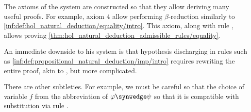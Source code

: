 \begin{remark}
  The axioms of the system are constructed so that they allow deriving many useful proofs. For example, axiom \( 4 \) allow performing \( \beta \)-reduction similarly to \ref{inf:def:hol_natural_deduction/equality/intro}. This axiom, along with rule , allows proving \cref{thm:hol_natural_deduction_admissible_rules/equality}.

  An immediate downside to his system is that hypothesis discharging in rules such as \ref{inf:def:propositional_natural_deduction/imp/intro} requires rewriting the entire proof, akin to , but more complicated.

  There are other subtleties. For example, we must be careful so that the choice of variable \( f \) from the abbreviation of \( \varphi \synwedge \psi \) so that it is compatible with substitution via rule .
\end{remark}

